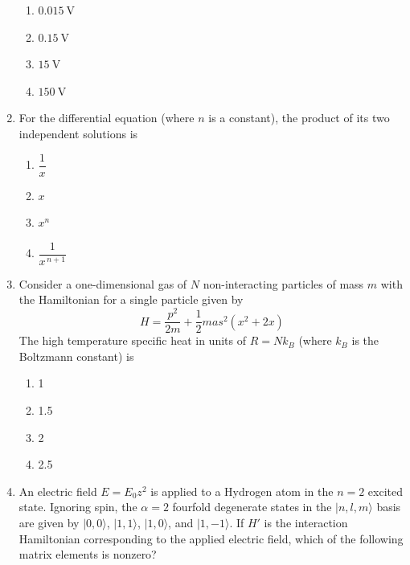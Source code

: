 \documentclass[journal,12pt,onecolumn]{IEEEtran}
\begin{document}
\begin{enumerate}[itemsep=0.45cm]
\begin{multicols}{2}
\begin{enumerate}
    \item $0.015\ \mathrm{V}$
    \item $0.15\ \mathrm{V}$
    \item $15\ \mathrm{V}$
    \item $150\ \mathrm{V}$
\end{enumerate}
\end{multicols}

\item For the differential equation (where $n$ is a constant), the product of its two independent solutions is

\hfill{}
\begin{multicols}{4}
\begin{enumerate}
    \item $\dfrac{1}{x}$
    \item $x$
    \item $x^{n}$
    \item $\dfrac{1}{x^{\,n+1}}$
\end{enumerate}
\end{multicols}

\newpage

\item Consider a one-dimensional gas of $N$ non-interacting particles of mass $m$ with the Hamiltonian for a single particle given by
\[
H = \frac{p^2}{2m} + \frac{1}{2} m a s^2 (x^2 + 2x)
\]
The high temperature specific heat in units of $R = N k_B$ (where $k_B$ is the Boltzmann constant) is

\hfill{}


\begin{enumerate}
\item 1
\item 1.5
\item 2
\item 2.5
\end{enumerate}

\item An electric field $E = E_0 z^2$ is applied to a Hydrogen atom in the $n=2$ excited state. Ignoring spin, the $\alpha = 2$ fourfold degenerate states in the $|n,l,m\rangle$ basis are given by $|0,0\rangle$, $|1,1\rangle$, $|1,0\rangle$, and $|1,-1\rangle$. If $H'$ is the interaction Hamiltonian corresponding to the applied electric field, which of the following matrix elements is nonzero?


\end{enumerate}
\end{document}
